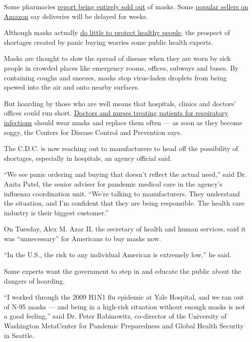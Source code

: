 Some pharmacies
\href{https://gothamist.com/news/chinese-new-yorkers-worried-about-coronavirus-are-wearing-masks-do-they-work}{report
being entirely sold out} of masks. Some
\href{https://www.businessinsider.com/amazon-sold-out-sellers-warn-counterfeit-masks-coronavirus-2020-1}{popular
sellers on Amazon} say deliveries will be delayed for weeks.

Although masks actually
\href{https://www.nytimes3xbfgragh.onion/2020/01/28/opinion/coronavirus-prevention-tips.html?action=click\&module=Opinion\&pgtype=Homepage}{do
little to protect healthy people}, the prospect of shortages created by
panic buying worries some public health experts.

Masks are thought to slow the spread of disease when they are worn by
sick people in crowded places like emergency rooms, offices, subways and
buses. By containing coughs and sneezes, masks stop virus-laden droplets
from being spewed into the air and onto nearby surfaces.

But hoarding by those who are well means that hospitals, clinics and
doctors' offices could run short.
\href{https://www.nytimes3xbfgragh.onion/2020/02/14/world/asia/china-coronavirus-doctors.html}{Doctors
and nurses treating patients for respiratory infections} should wear
masks and replace them often --- as soon as they become soggy, the
Centers for Disease Control and Prevention says.

The C.D.C. is now reaching out to manufacturers to head off the
possibility of shortages, especially in hospitals, an agency official
said.

``We see panic ordering and buying that doesn't reflect the actual
need,'' said Dr. Anita Patel, the senior adviser for pandemic medical
care in the agency's influenza coordination unit. ``We're talking to
manufacturers. They understand the situation, and I'm confident that
they are being responsible. The health care industry is their biggest
customer.''

On Tuesday, Alex M. Azar II, the secretary of health and human services,
said it was ``unnecessary'' for Americans to buy masks now.

``In the U.S., the risk to any individual American is extremely low,''
he said.

Some experts want the government to step in and educate the public about
the dangers of hoarding.

``I worked through the 2009 H1N1 flu epidemic at Yale Hospital, and we
ran out of N-95 masks --- and being in a high-risk situation without
enough masks is not a good feeling,'' said Dr. Peter Rabinowitz,
co-director of the University of Washington MetaCenter for Pandemic
Preparedness and Global Health Security in Seattle.

